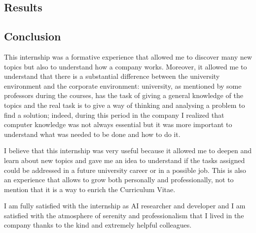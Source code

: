 \documentclass[14pt]{extarticle}
\def\sp{\vspace{5pt}}
\def\ss{\vspace{25pt}}
\def\ppn{\vspace{10pt}}
\begin{document}
\newpage
\begin{center}
	\section{Results}
	\sp
\end{center}
\begin{flushleft}
\end{flushleft}

\newpage
\begin{center}
	\section{Conclusion}
	\sp
\end{center}
\begin{flushleft}

This internship was a formative experience that allowed me to discover many new topics but also to understand how a company works. Moreover, it allowed me to understand that there is a substantial difference between the university environment and the corporate environment: university, as mentioned by some professors during the courses, has the task of giving a general knowledge of the topics and the real task is to give a way of thinking and analysing a problem to find a solution; indeed, during this period in the company I realized that computer knowledge was not always essential but it was more important to understand what was needed to be done and how to do it.
\ppn

I believe that this internship was very useful because it allowed me to deepen and learn about new topics and gave me an idea to understand if the tasks assigned could be addressed in a future university career or in a possible job.
\newline
This is also an experience that allows to grow both personally and professionally, not to mention that it is a way to
enrich the Curriculum Vitae.

\ppn
I am fully satisfied with the internship as AI researcher and developer and I am satisfied with the atmosphere of serenity and professionalism that I lived in the company thanks to the kind and extremely helpful colleagues.
	\ss
\end{flushleft}
\end{document}
